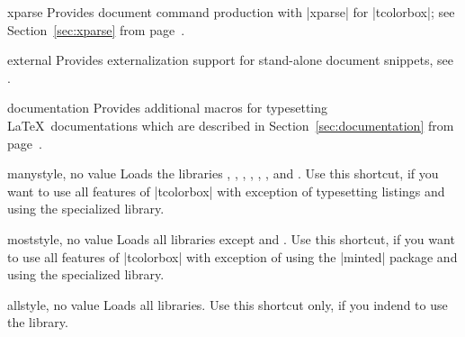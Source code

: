 {\begin{docTcbKey}[library]{xparse}{}{}
  Provides document command production with |xparse| for |tcolorbox|;
  see Section~\ref{sec:xparse} from page~\pageref{sec:xparse}.
\end{docTcbKey}

\begin{docTcbKey}[library]{external}{}{}
  Provides externalization support for stand-alone document snippets,
  see .
\end{docTcbKey}

\clearpage
\begin{docTcbKey}[library]{documentation}{}{}
  Provides additional
  macros for typesetting \LaTeX\ documentations
  which are described in Section~\ref{sec:documentation}
  from page~\pageref{sec:documentation}.
\end{docTcbKey}

\begin{docTcbKey}[library]{many}{}{style, no value}
  Loads the libraries , , , ,
  , , and .
  Use this shortcut, if you want to use all features of |tcolorbox|
  with exception of typesetting listings and using
  the specialized  library.
\end{docTcbKey}

\begin{docTcbKey}[library]{most}{}{style, no value}
  Loads all libraries except  and .
  Use this shortcut, if you want to use all features of |tcolorbox|
  with exception of using the |minted| package and using
  the specialized  library.
\end{docTcbKey}

\begin{docTcbKey}[library]{all}{}{style, no value}
  Loads all libraries. Use this shortcut only, if you indend to use the
   library.
\end{docTcbKey}


}
